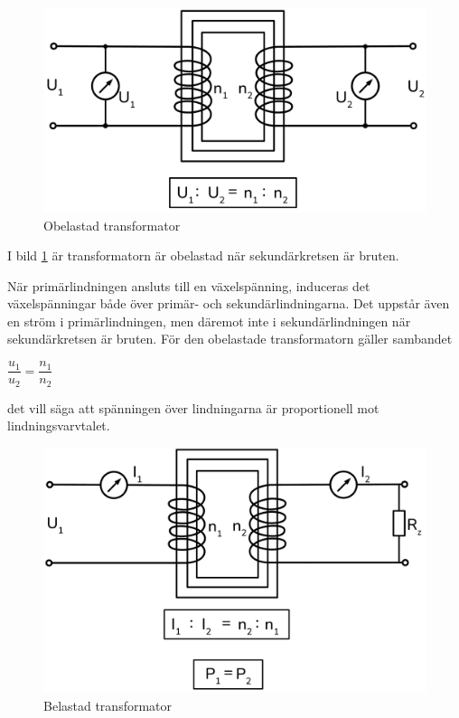 \begin{figure}[ht]
\begin{center}
\includegraphics[width=\textwidth]{images/cropped_pdfs/bild_2_2-06.pdf}
\caption{Obelastad transformator}
\label{fig:BildII2-6}
\end{center}
\end{figure}

I bild \ref{fig:BildII2-6} är transformatorn är obelastad när sekundärkretsen
är bruten.

När primärlindningen ansluts till en växelspänning, induceras det
växelspänningar både över primär- och sekundärlindningarna. Det uppstår även en
ström i primärlindningen, men däremot inte i sekundärlindningen när
sekundärkretsen är bruten. För den obelastade transformatorn gäller sambandet

\(\dfrac{u_1}{u_2} = \dfrac{n_1}{n_2}\)

det vill säga att spänningen över lindningarna är proportionell mot lindningsvarvtalet.

\begin{figure}[ht]
\begin{center}
\includegraphics[width=\textwidth]{images/cropped_pdfs/bild_2_2-07.pdf}
\caption{Belastad transformator}
\label{fig:BildII2-7}
\end{center}
\end{figure}

